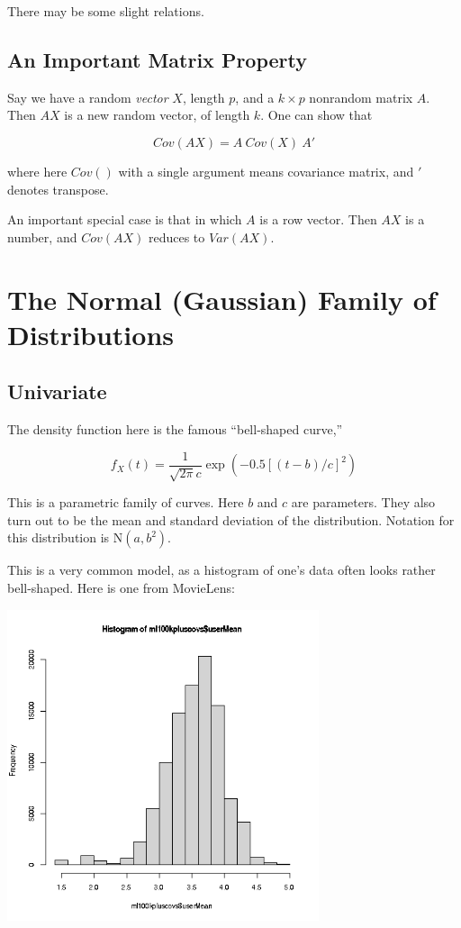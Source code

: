 There may be some slight relations.

\subsection{An Important Matrix Property}

Say we have a random \textit{vector} $X$, length $p$, and a $k \times p$
nonrandom matrix $A$.  Then $AX$ is a new random vector, of length $k$.
One can show that

\begin{equation}
Cov(AX) = A ~ Cov(X) ~ A'
\end{equation}

where here $Cov()$ with a single argument means covariance matrix, and
$'$ denotes transpose.

An important special case is that in which $A$ is a row vector.  Then
$AX$ is a number, and $Cov(AX)$ reduces to $Var(AX)$.

\section{The Normal (Gaussian) Family of Distributions}

\subsection{Univariate}

The density function here is the famous ``bell-shaped curve,''

\begin{equation}
f_X(t) = \frac{1}{\sqrt{2\pi} c}
\exp
{
\left ( -0.5 \left [ (t-b)/c  \right ]^2 
\right )
}
\end{equation}

This is a parametric family of curves.  Here $b$ and $c$ are parameters.
They also turn out to be the mean and standard deviation of the
distribution.  Notation for this distribution is $\textrm{N}(a,b^2)$.

This is a very common model, as a histogram of one's data often looks
rather bell-shaped.  Here is one from MovieLens:

\includegraphics[width=3.6in]{Images/HistUserMean.png} 

